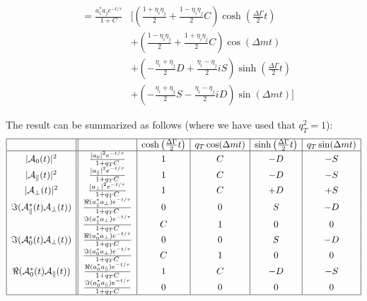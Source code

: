 \documentclass[a4paper,9pt,twoside]{article}
\begin{document}
\begin{eqnarray}
                                &= \frac{ a_i^* a_j e^{-t/\tau}} {1+C}&\Biggl[ \left( \frac{1+\eta_i\eta_j}{2} +  \frac{1-\eta_i\eta_j}{2}C\right) \cosh\left(\frac{\Delta\Gamma}{2}t\right) \\
                                                                          &&  +\left( \frac{1-\eta_i\eta_j}{2} +  \frac{1+\eta_i\eta_j}{2}C\right) \cos(\Delta m t) \\
                                                                          &&  +\left(-\frac{\eta_i+\eta_j}{2}D + \frac{\eta_i-\eta_j}{2}iS\right) \sinh\left(\frac{\Delta\Gamma}{2}t\right) \\
                                                                          &&  +\left(-\frac{\eta_i+\eta_j}{2}S - \frac{\eta_i-\eta_j}{2}iD\right) \sin(\Delta m t) \Biggr] 
\end{eqnarray}

The result can be summarized as follows (where we have used that $q_T^2=1$):
\begin{equation}
\begin{array}{|c|| c | c | c | c | c |}
 \hline
                                             &                          &  \cosh\left(\frac{\Delta\Gamma}{2}t\right) & q_T \cos(\Delta m t)  & \sinh\left(\frac{\Delta\Gamma}{2}t\right) &q_T\sin(\Delta m t)  \\
 \hline
|{\cal A}_0(t)|^2                           &\frac{  | a_0 |^2 e^{-t/\tau}}{1+q_TC}                  & 1 &   C  &  -D & -S   \\
|{\cal A}_\parallel(t)|^2                   &\frac{  | a_\parallel |^2 e^{-t/\tau}}{1+q_TC}          & 1 &   C  &  -D & -S   \\
|{\cal A}_\perp(t)|^2                       &\frac{  | a_\perp |^2 e^{-t/\tau}}{1+q_TC}              & 1 &   C  &  +D & +S   \\
\Im({\cal A}_\parallel^*(t){\cal A}_\perp(t)) &\frac{  \Re(a_\parallel^* a_\perp)e^{-t/\tau}}{1+q_TC}& 0 &   0  &   S & -D   \\                         
                                            &\frac{  \Im(a_\parallel^* a_\perp)e^{-t/\tau}}{1+q_TC}  & C &   1  &   0 &  0   \\
\Im({\cal A}_0^*(t){\cal A}_\perp(t))         &\frac{  \Re(a_0^* a_\perp)e^{-t/\tau}}{1+q_TC}        & 0 &   0  &   S & -D   \\
                                            &\frac{  \Im(a_0^* a_\perp)e^{-t/\tau}}{1+q_TC}          & C &   1  &   0 &  0   \\
\Re({\cal A}_0^*(t){\cal A}_\parallel(t))     &\frac{  \Re(a_0^*a_\parallel)e^{-t/\tau}}{1+q_TC}     & 1 &   C  &  -D & -S   \\
                                            &\frac{  \Im(a_0^*a_\parallel)e^{-t/\tau}}{1+q_TC}       & 0 &   0  &   0 &  0   \\
\hline
\end{array}
\end{equation}
\end{document}
